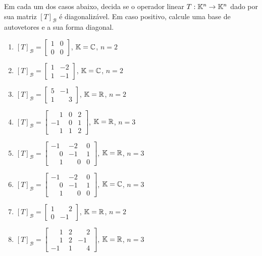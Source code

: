 \documentclass[12pt]{exam}
\begin{document}
\begin{exercicio}
  Em cada um dos casos abaixo, decida se o operador linear $T : \mathbb{K}^n \to \mathbb{K}^n$ dado por sua matriz $[T]_\mathcal{B}$ \'e diagonaliz\'avel. Em caso positivo, calcule uma base de autovetores e a sua forma diagonal.
  \begin{enumerate}[label=({\alph*})]
    \item $[T]_\mathcal{B} = \begin{bmatrix} 1 & 0\\ 0 & 0\end{bmatrix}$, $\mathbb{K} = \mathbb{C}$, $n = 2$
    \item $[T]_\mathcal{B} = \begin{bmatrix} 1 & -2\\ 1 & -1\end{bmatrix}$, $\mathbb{K} = \mathbb{C}$, $n = 2$
    \item $[T]_\mathcal{B} = \begin{bmatrix} 5 & -1\\ 1 & \phantom{-} 3\end{bmatrix}$, $\mathbb{K} = \mathbb{R}$, $n = 2$
    \item $[T]_\mathcal{B} = \begin{bmatrix} \phantom{-} 1 & 0 & 2\\ -1 & 0 & 1\\ \phantom{-} 1 & 1 & 2\end{bmatrix}$, $\mathbb{K} = \mathbb{R}$, $n = 3$
    \item $[T]_\mathcal{B} = \begin{bmatrix} -1 & -2 & 0\\ \phantom{-} 0 & -1 & 1\\ \phantom{-} 1 & \phantom{-} 0 & 0\end{bmatrix}$, $\mathbb{K} = \mathbb{R}$, $n = 3$
    \item $[T]_\mathcal{B} = \begin{bmatrix} -1 & -2 & 0\\ \phantom{-} 0 & -1 & 1\\ \phantom{-} 1 & \phantom{-} 0 & 0\end{bmatrix}$, $\mathbb{K} = \mathbb{C}$, $n = 3$
    \item $[T]_\mathcal{B} = \begin{bmatrix} 1 & \phantom{-} 2\\ 0 & -1\end{bmatrix}$, $\mathbb{K} = \mathbb{R}$, $n = 2$
    \item $[T]_\mathcal{B} = \begin{bmatrix} \phantom{-} 1 & 2 & \phantom{-} 2\\ \phantom{-} 1 & 2 & -1\\ -1 & 1 & \phantom{-} 4\end{bmatrix}$, $\mathbb{K} = \mathbb{R}$, $n = 3$

\end{enumerate}
\end{exercicio}
\end{document}
